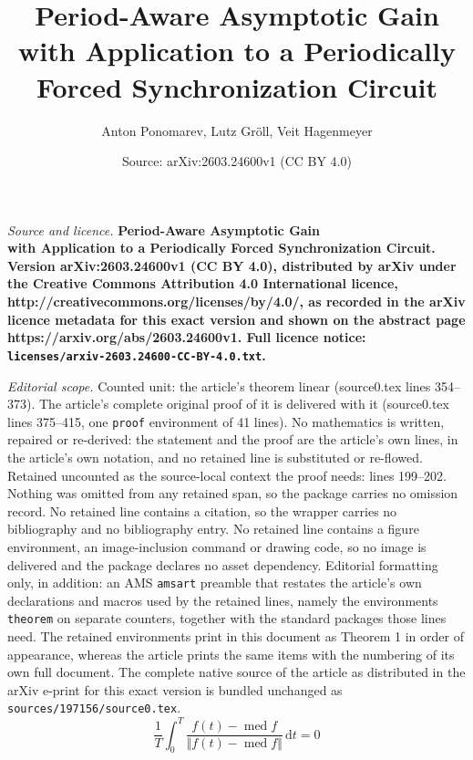 \documentclass[10pt,a4paper]{amsart}
\title{\LARGE \bf Period-Aware Asymptotic Gain\\with Application to a Periodically Forced Synchronization Circuit}
\author{Anton Ponomarev, Lutz Gr\"oll, Veit Hagenmeyer}
\date{Source: arXiv:2603.24600v1 (CC BY 4.0)}
\newcommand{\dif}{\mathrm{d}}
\DeclareMathOperator{\median}{med}
\newcommand{\norm}[1]{\Vert #1 \Vert}
\begin{document}
\maketitle

\noindent\emph{Source and licence.} \LARGE \bf Period-Aware Asymptotic Gain\\with Application to a Periodically Forced Synchronization Circuit. Version arXiv:2603.24600v1 (CC BY 4.0), distributed by arXiv under the Creative Commons Attribution 4.0 International licence, http://creativecommons.org/licenses/by/4.0/, as recorded in the arXiv licence metadata for this exact version and shown on the abstract page https://arxiv.org/abs/2603.24600v1. Full licence notice: \texttt{licenses/arxiv-2603.24600-CC-BY-4.0.txt}.\par\smallskip

\noindent\textit{Editorial scope.} Counted unit: the article's theorem linear (source0.tex lines 354--373). The article's complete original proof of it is delivered with it (source0.tex lines 375--415, one \texttt{proof} environment of 41 lines). No mathematics is written, repaired or re-derived: the statement and the proof are the article's own lines, in the article's own notation, and no retained line is substituted or re-flowed.  Retained uncounted as the source-local context the proof needs: lines 199--202.  Nothing was omitted from any retained span, so the package carries no omission record.  No retained line contains a citation, so the wrapper carries no bibliography and no bibliography entry.  No retained line contains a figure environment, an image-inclusion command or drawing code, so no image is delivered and the package declares no asset dependency.  Editorial formatting only, in addition: an AMS \texttt{amsart} preamble that restates the article's own declarations and macros used by the retained lines, namely the environments \texttt{theorem} on separate counters, together with the standard packages those lines need.  The retained environments print in this document as Theorem 1 in order of appearance, whereas the article prints the same items with the numbering of its own full document.  The complete native source of the article as distributed in the arXiv e-print for this exact version is bundled unchanged as \texttt{sources/197156/source0.tex}.
    \begin{equation}
        \label{eq: median definition implicit}
        \frac1T \int_0^T \frac{f(t) - \median f}{\norm{f(t) - \median f}} \,\dif t = 0
    \end{equation}
\end{document}
